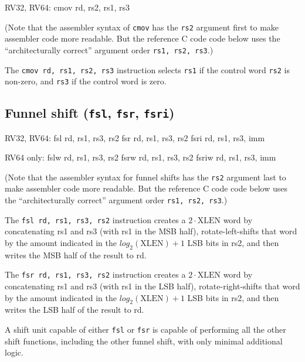 \begin{rvb}
  RV32, RV64:
    cmov rd, rs2, rs1, rs3
\end{rvb}

(Note that the assembler syntax of {\tt cmov} has the {\tt rs2} argument first
to make assembler code more readable. But the reference C code code below uses
the ``architecturally correct'' argument order {\tt rs1, rs2, rs3}.)

The {\tt cmov rd, rs1, rs2, rs3} instruction selects {\tt rs1} if the control
word {\tt rs2} is non-zero, and {\tt rs3} if the control word is zero.



\subsection{Funnel shift ({\tt fsl}, {\tt fsr}, {\tt fsri})}

\begin{rvb}
  RV32, RV64:
    fsl  rd, rs1, rs3, rs2
    fsr  rd, rs1, rs3, rs2
    fsri rd, rs1, rs3, imm

  RV64 only:
    fslw  rd, rs1, rs3, rs2
    fsrw  rd, rs1, rs3, rs2
    fsriw rd, rs1, rs3, imm
\end{rvb}

(Note that the assembler syntax for funnel shifts has the {\tt rs2} argument
last to make assembler code more readable. But the reference C code code below
uses the ``architecturally correct'' argument order {\tt rs1, rs2, rs3}.)

The {\tt fsl rd, rs1, rs3, rs2} instruction creates a $2\cdot\textrm{XLEN}$ word
by concatenating rs1 and rs3 (with rs1 in the MSB half), rotate-left-shifts that
word by the amount indicated in the $log_2(\textrm{XLEN})+1$ LSB bits in rs2, and
then writes the MSB half of the result to rd.

The {\tt fsr rd, rs1, rs3, rs2} instruction creates a $2\cdot\textrm{XLEN}$ word
by concatenating rs1 and rs3 (with rs1 in the LSB half), rotate-right-shifts that
word by the amount indicated in the $log_2(\textrm{XLEN})+1$ LSB bits in rs2, and
then writes the LSB half of the result to rd.





A shift unit capable of either {\tt fsl} or {\tt fsr} is capable of performing all
the other shift functions, including the other funnel shift, with only minimal additional
logic.

